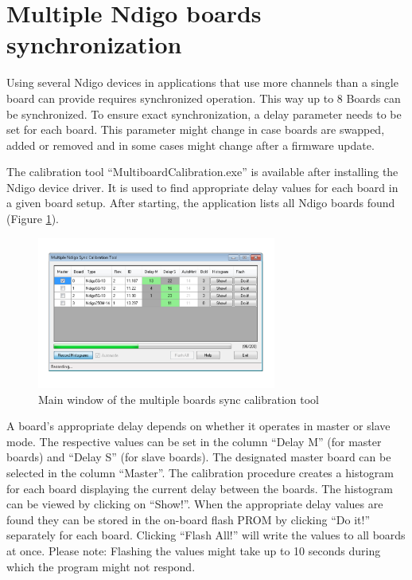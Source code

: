 \section{Multiple Ndigo boards synchronization}
    Using several Ndigo devices in applications that use more channels than a single board can provide requires synchronized operation. This way up to 8 Boards can be synchronized. To ensure exact synchronization, a delay parameter needs to be set for each board. This parameter might change in case boards are swapped, added or removed and in some cases might change after a firmware update.\par

    The calibration tool ``MultiboardCalibration.exe'' is available after installing the Ndigo device driver. It is used to find appropriate delay values for each board in a given board setup. After starting, the application lists all Ndigo boards found (Figure \ref{fig:SyncCalibTool}).\par

    \begin{figure}[ht]
        \begin{center}
            \includegraphics[width=0.7\textwidth]{figures/SyncCalibTool.pdf}
            \caption{Main window of the multiple boards sync calibration tool\label{fig:SyncCalibTool}}
        \end{center}
    \end{figure}

    A board's appropriate delay depends on whether it operates in master or slave mode. The respective values can be set in the column ``Delay M'' (for master boards) and ``Delay S'' (for slave boards). The designated master board can be selected in the column ``Master''. The calibration procedure creates a histogram for each board displaying the current delay between the boards. The histogram can be viewed by clicking on ``Show!''. When the appropriate delay values are found they can be stored in the on-board flash PROM by clicking ``Do it!'' separately for each board. Clicking ``Flash All!'' will write the values to all boards at once. Please note: Flashing the values might take up to 10 seconds during which the program might not respond.\par


